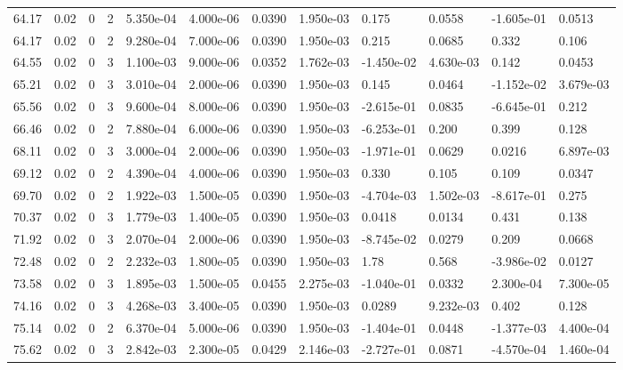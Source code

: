 \documentclass[preview]{standalone}
\begin{document}
{{{{\begin{tabular}{L{1.2cm}C{1.2cm} C{0.3cm}C{0.5cm} C{1.4cm}C{1.4cm} C{1.4cm}C{1.4cm} C{1.6cm}C{1.6cm} C{1.6cm}C{1.6cm}}
  64.17  &  0.02  & 0     &  2 &  5.350e-04  & 4.000e-06  &  0.0390&   1.950e-03& 0.175 & 0.0558   &  -1.605e-01 & 0.0513  \\ 
  64.17  &  0.02  & 0     &  2 &  9.280e-04  & 7.000e-06  &  0.0390&   1.950e-03& 0.215 & 0.0685   &  0.332 & 0.106  \\ 
  64.55  &  0.02  & 0     &  3 &  1.100e-03  & 9.000e-06  &  0.0352&   1.762e-03& -1.450e-02 & 4.630e-03   &  0.142 & 0.0453  \\ 
  65.21  &  0.02  & 0     &  3 &  3.010e-04  & 2.000e-06  &  0.0390&   1.950e-03& 0.145 & 0.0464   &  -1.152e-02 & 3.679e-03  \\ 
  65.56  &  0.02  & 0     &  3 &  9.600e-04  & 8.000e-06  &  0.0390&   1.950e-03& -2.615e-01 & 0.0835   &  -6.645e-01 & 0.212  \\ 
  66.46  &  0.02  & 0     &  2 &  7.880e-04  & 6.000e-06  &  0.0390&   1.950e-03& -6.253e-01 & 0.200   &  0.399 & 0.128  \\ 
  68.11  &  0.02  & 0     &  3 &  3.000e-04  & 2.000e-06  &  0.0390&   1.950e-03& -1.971e-01 & 0.0629   &  0.0216 & 6.897e-03  \\ 
  69.12  &  0.02  & 0     &  2 &  4.390e-04  & 4.000e-06  &  0.0390&   1.950e-03& 0.330 & 0.105   &  0.109 & 0.0347  \\ 
  69.70  &  0.02  & 0     &  2 &  1.922e-03  & 1.500e-05  &  0.0390&   1.950e-03& -4.704e-03 & 1.502e-03   &  -8.617e-01 & 0.275  \\ 
  70.37  &  0.02  & 0     &  3 &  1.779e-03  & 1.400e-05  &  0.0390&   1.950e-03& 0.0418 & 0.0134   &  0.431 & 0.138  \\ 
  71.92  &  0.02  & 0     &  3 &  2.070e-04  & 2.000e-06  &  0.0390&   1.950e-03& -8.745e-02 & 0.0279   &  0.209 & 0.0668  \\ 
  72.48  &  0.02  & 0     &  2 &  2.232e-03  & 1.800e-05  &  0.0390&   1.950e-03& 1.78 & 0.568   &  -3.986e-02 & 0.0127  \\ 
  73.58  &  0.02  & 0     &  3 &  1.895e-03  & 1.500e-05  &  0.0455&   2.275e-03& -1.040e-01 & 0.0332   &  2.300e-04 & 7.300e-05  \\ 
  74.16  &  0.02  & 0     &  3 &  4.268e-03  & 3.400e-05  &  0.0390&   1.950e-03& 0.0289 & 9.232e-03   &  0.402 & 0.128  \\ 
  75.14  &  0.02  & 0     &  2 &  6.370e-04  & 5.000e-06  &  0.0390&   1.950e-03& -1.404e-01 & 0.0448   &  -1.377e-03 & 4.400e-04  \\ 
  75.62  &  0.02  & 0     &  3 &  2.842e-03  & 2.300e-05  &  0.0429&   2.146e-03& -2.727e-01 & 0.0871   &  -4.570e-04 & 1.460e-04  \\ 

\end{tabular}}}}}
\end{document}
